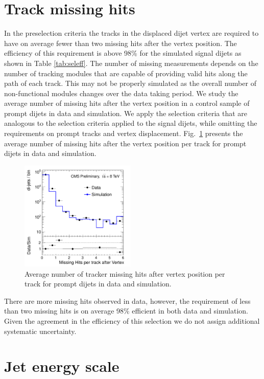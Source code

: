 \section{Track missing hits}

In the preselection criteria the tracks in the displaced dijet vertex are required to have on average
 fewer than two missing hits after the vertex position. The efficiency of this requirement is above 98\% 
for the simulated signal dijets as shown in Table \ref{tab:seleff}. 
The number of missing measurements depends on the number of tracking modules that are capable of providing
valid hits along the path of each track. This may not be properly simulated as the overall number of 
non-functional modules changes over the data taking period. We study the average number of missing
hits after the vertex position in a control sample of prompt dijets in data and simulation. We apply the selection criteria that are analogous to the selection criteria applied to the signal
dijets,
 while omitting the requirements on prompt tracks and vertex displacement. Fig.~\ref{fig:misshits} presents
the average number of missing hits after the vertex position per track for prompt dijets in data and simulation.

\begin{figure}[htbp]
\centering
\includegraphics[width=0.49\textwidth]{plots/misshits/misshits.pdf}
\caption{Average number of tracker missing hits after vertex position per track for prompt dijets
in data and simulation.\label{fig:misshits}}
\end{figure}

There are more missing hits observed in data, however, the requirement of less than two
missing hits is on average 98\% efficient in both data and simulation. Given the agreement in the efficiency
of this selection we do not assign additional systematic uncertainty. 

\section{Jet energy scale}
\label{sec:jessys}

